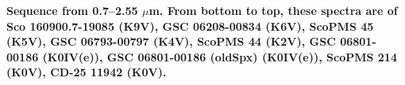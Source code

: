 {\bf Sequence from 0.7–2.55 $\mu$m. From bottom to top, these spectra are of Sco 160900.7-19085 (K9V), GSC 06208-00834 (K6V), ScoPMS 45 (K5V), GSC 06793-00797 (K4V), ScoPMS 44 (K2V), GSC 06801-00186 (K0IV(e)), GSC 06801-00186 (oldSpx) (K0IV(e)), ScoPMS 214 (K0V), CD-25 11942 (K0V).\label{fig:stack-plot-k}}
